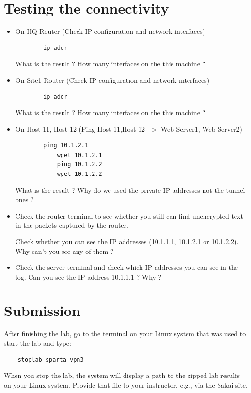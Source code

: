 \section{Testing the connectivity}
\begin{itemize}
	\item On HQ-Router (Check IP configuration and network interfaces)
	\begin{verbatim}
	    ip addr
	\end{verbatim}

	What is the result ? How many interfaces on the this machine ?

	\item On Site1-Router (Check IP configuration and network interfaces)
	\begin{verbatim}
	    ip addr
	\end{verbatim}

	What is the result ? How many interfaces on the this machine ?

	\item On Host-11, Host-12 (Ping Host-11,Host-12 -$>$ Web-Server1, Web-Server2)
	\begin{verbatim}
	    ping 10.1.2.1
			wget 10.1.2.1
			ping 10.1.2.2
			wget 10.1.2.2
	\end{verbatim}

	What is the result ? Why do we used the private IP addresses not the tunnel ones ?

	\item Check the router terminal to see whether you still can find unencrypted text in the packets captured by the router.

	Check whether you can see the IP addresses (10.1.1.1, 10.1.2.1 or 10.1.2.2). Why can't you see any of them ?

	\item Check the server terminal and check which IP addresses you can see in the log. Can you see the IP address 10.1.1.1 ? Why ?

\end{itemize}

\section{Submission}
After finishing the lab, go to the terminal on your Linux system that was used to start the lab and type:
\begin{verbatim}
    stoplab sparta-vpn3
\end{verbatim}
When you stop the lab, the system will display a path to the zipped lab results on your Linux system.  Provide that file to
your instructor, e.g., via the Sakai site.


